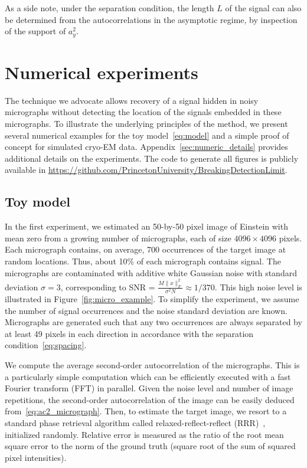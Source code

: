 \documentclass[12pt]{article}
\newcommand{\1}{\mathbf{1}}
\theoremstyle{plain}
\theoremstyle{definition}
\theoremstyle{remark}
\theoremstyle{plain}
\theoremstyle{remark}
\theoremstyle{plain}
\theoremstyle{plain}
\begin{document}
As a side note, under the separation condition, the length $L$ of the signal can also be determined from the autocorrelations in the asymptotic regime, by inspection of the support of $a_y^2$.


\section{Numerical experiments}

The technique we advocate allows recovery of a signal hidden in noisy micrographs without detecting the location  of the signals embedded in these micrographs. To illustrate the underlying principles of the method, we present several numerical examples for the toy model~\eqref{eq:model} and a simple proof of concept for simulated cryo-EM data.  Appendix~\ref{sec:numeric_details} provides additional details on the experiments. 
The code to generate all figures is publicly available in \url{https://github.com/PrincetonUniversity/BreakingDetectionLimit}.

\subsection{Toy model}
In the first experiment, we estimated 
an 50-by-50 pixel image of Einstein with mean zero from a growing number of micrographs, each of size $4096\times 4096$ pixels. Each micrograph contains, on average, 700 occurrences of the target image at random locations. 
Thus, about 10\% of each micrograph contains signal. The micrographs are contaminated with additive white Gaussian noise with standard deviation $\sigma=3$,  corresponding  to SNR = $\frac{M\|x\|_F^2} {\sigma^2N} \approx1/370$. This high noise level is illustrated in Figure~\ref{fig:micro_example}. 
To simplify the experiment, we assume the number of signal occurrences and the noise standard deviation are known. Micrographs are generated such that any two occurrences are always separated by at least 49 pixels in each direction in accordance with the separation condition~\eqref{eq:spacing}. 

We compute the average second-order autocorrelation of the micrographs. This is a particularly simple computation which can be efficiently executed with a fast Fourier transform (FFT) in parallel.  
Given the noise level and number of image repetitions, the second-order autocorrelation of the image can be easily deduced from~\eqref{eq:ac2_micrograph}.  Then, to estimate the target image, we resort to a standard phase retrieval algorithm called relaxed-reflect-reflect (RRR)~\cite{elser2017rrr}, initialized randomly.
Relative error is measured as the ratio of the root mean square error to the norm of the ground truth (square root of the sum of squared pixel intensities).
\end{document}
